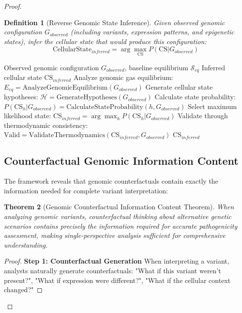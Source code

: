 \documentclass[12pt,a4paper]{article}
\newtheorem{theorem}{Theorem}[section]
\newtheorem{definition}[theorem]{Definition}
\begin{document}
\begin{proof}
\begin{definition}[Reverse Genomic State Inference]
Given observed genomic configuration $G_{observed}$ (including variants, expression patterns, and epigenetic states), infer the cellular state that would produce this configuration:
$$\text{CellularState}_{inferred} = \arg\max_{\text{CS}} P(\text{CS} | G_{observed})$$
\end{definition}

\begin{algorithm}
\caption{Reverse Genomic State Inference Algorithm}
\begin{algorithmic}[1]
\Require Observed genomic configuration $G_{observed}$, baseline equilibrium $\mathcal{S}_{eq}$
\Ensure Inferred cellular state $\text{CS}_{inferred}$
\State Analyze genomic gas equilibrium: $E_{eq} = \text{AnalyzeGenomicEquilibrium}(G_{observed})$
\State Generate cellular state hypotheses: $\mathcal{H} = \text{GenerateHypotheses}(G_{observed})$
    \State Calculate state probability: $P(\text{CS}_h | G_{observed}) = \text{CalculateStateProbability}(h, G_{observed})$
\EndFor
\State Select maximum likelihood state: $\text{CS}_{inferred} = \arg\max_h P(\text{CS}_h | G_{observed})$
\State Validate through thermodynamic consistency: $\text{Valid} = \text{ValidateThermodynamics}(\text{CS}_{inferred}, G_{observed})$
\Return $\text{CS}_{inferred}$
\end{algorithmic}
\end{algorithm}

\subsection{Counterfactual Genomic Information Content}

The framework reveals that genomic counterfactuals contain exactly the information needed for complete variant interpretation:

\begin{theorem}[Genomic Counterfactual Information Content Theorem]
When analyzing genomic variants, counterfactual thinking about alternative genetic scenarios contains precisely the information required for accurate pathogenicity assessment, making single-perspective analysis sufficient for comprehensive understanding.
\end{theorem}

\begin{proof}
\textbf{Step 1: Counterfactual Generation}
When interpreting a variant, analysts naturally generate counterfactuals: "What if this variant weren't present?", "What if expression were different?", "What if the cellular context changed?"


\end{proof}
\end{proof}
\end{document}
